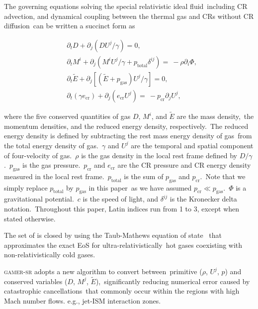 \documentclass[twocolumn]{aastex631}
\begin{document}
  The governing equations solving the special relativistic ideal fluid\
  including CR advection, and dynamical coupling between the thermal gas and CRs without CR diffusion\
  can be written a succinct form as


  \begin{subequations}
    \label{governing-eq}
    \begin{align}
     &\partial_{t} D+\partial_{j} \left(DU^{j}/\gamma\right)=0,\label{D evolution}\\
     &\partial_{t} M^{i}+\partial_{j} \left(M^{i}U^{j}/\gamma+p_{\text{total}}\delta^{ij}\right)=\
     -\rho\partial_{i}\Phi,\label{M evolution}\\
     &\partial_{t} \tilde{E}+\partial_j \left[\left(\tilde{E}+p_{\text{gas}}\right)U^{j}/\gamma\right]=0, \label{E evoltion}\\
     &\partial_{t} \left(\gamma e_{\text{cr}}\right) + \partial_{j} \left(e_{\text{cr}}U^{j}\right)=\
     -p_{\text{cr}} \partial_{j} U^{j},\label{E evolution}
    \end{align}
  \end{subequations}


  where the five conserved quantities of gas $D$, $M^{i}$, and $\tilde{E}$ are the mass density,\
  the momentum densities, and the reduced energy density, respectively.\
  The reduced energy density is defined by subtracting the rest mass energy density of gas\
  from the total energy density of gas.\
  $\gamma$ and $U^{j}$ are the temporal and spatial component of four-velocity of gas.\
  $\rho$ is the gas density in the local rest frame defined by $D/\gamma$.\
  $p_{\text{gas}}$ is the gas pressure.\
  $p_{\text{cr}}$ and $e_{\text{cr}}$ are the CR pressure and CR energy density measured in the local rest frame.\
  $p_{\text{total}}$ is the sum of $p_{\text{gas}}$ and $p_{\text{cr}}$.\
  Note that we simply replace $p_{\text{total}}$ by $p_{\text{gas}}$ in this paper\
  as we have assumed $p_{\text{cr}}\ll p_{\text{gas}}$.\
  $\Phi$ is a gravitational potential.\
  $c$ is the speed of light, and $\delta^{ij}$ is the Kronecker delta notation.\
  Throughout this paper, Latin indices run from 1 to 3, except when stated otherwise.\

  The set of  is closed by using the Taub-Mathews equation of state \citep{Taub,TM_EOS}\
  that approximates the exact EoS \citep{Synge} for ultra-relativistically\
  hot gases coexisting with non-relativistically cold gases.

  \textsc{gamer-sr} adopts a new algorithm \citep{tseng2021} to convert between\
  primitive ($\rho$, $U^{j}$, $p$) and conserved variables ($D$, $M^{j}$, $\tilde{E}$),\
  significantly reducing numerical error caused by catastrophic cancellations\
  that commonly occur within the regions with high Mach number flows. e.g., jet-ISM interaction zones.
\end{document}
